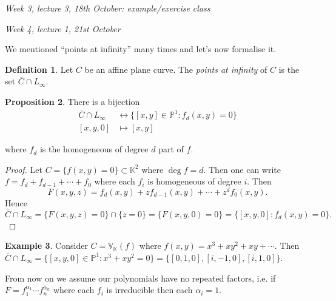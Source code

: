 \documentclass{article}
\newcommand{\K}{\mathbb{K}}
\newcommand{\V}{\mathbb{V}}
\newcommand{\p}{\mathbb{P}}
\theoremstyle{definition}
\newtheorem{defn}{Definition}[subsection]
\newtheorem{prop}[defn]{Proposition}
\newtheorem{example}[defn]{Example}
\begin{document}
\begin{flushright}
\textit{Week 3, lecture 3, 18th October: example/exercise class}
\end{flushright}

\begin{flushright}
\textit{Week 4, lecture 1, 21st October}
\end{flushright}

We mentioned ``points at infinity'' many times and let's now formalise it.
\begin{defn}
Let $C$ be an affine plane curve. The \textit{points at infinity} of $C$ is the set $\overline C\cap L_\infty$.
\end{defn}

\begin{prop}
There is a bijection
\[
\begin{aligned}
\overline C\cap L_\infty &\leftrightarrow \{[x,y]\in\p^1:f_d(x,y)=0\} \\
[x,y,0]&\mapsto [x,y]
\end{aligned}
\]
\end{prop}
where $f_d$ is the homogeneous of degree $d$ part of $f$.
\begin{proof}
Let $C=\{f(x,y)=0\}\subset\K^2$ where $\deg f=d$. Then one can write $f=f_d+f_{d-1}+\cdots+f_0$ where each $f_i$ is homogeneous of degree $i$. Then
\[
F(x,y,z)=f_d(x,y)+zf_{d-1}(x,y)+\cdots+z^df_0(x,y).
\]
Hence
\[
\overline C\cap L_\infty=\{F(x,y,z)=0\}\cap\{z=0\}=\{F(x,y,0)=0\}=\{[x,y,0]:f_d(x,y)=0\}.
\]
\end{proof}
\begin{example}
Consider $C=\V_\K(f)$ where $f(x,y)=x^3+xy^2+xy+\cdots$. Then $\overline C\cap L_\infty=\{[x,y,0]\in\p^1:x^3+xy^2=0\}=\{[0,1,0],[i,-1,0],[i,1,0]\}$.
\end{example}

From now on we assume our polynomials have no repeated factors, i.e. if $F=f_1^{\alpha_1}\cdots f_n^{\alpha_n}$ where each $f_i$ is irreducible then each $\alpha_i=1$.
\end{document}
